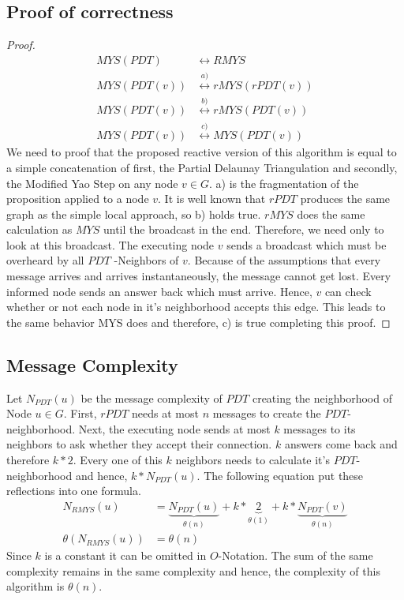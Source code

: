 \subsection{Proof of correctness}
\begin{proof}
\begin{equation*}
\begin{split}
	MYS(PDT) &\leftrightarrow RMYS\\
	MYS(PDT(v)) &\stackrel{a)}{\leftrightarrow} rMYS(rPDT(v)) \\
    MYS(PDT(v)) &\stackrel{b)}{\leftrightarrow} rMYS(PDT(v))\\
    MYS(PDT(v)) &\stackrel{c)}{\leftrightarrow} MYS(PDT(v)) 
\end{split}
\end{equation*}
We need to proof that the proposed reactive version of this algorithm is equal to a simple concatenation of first, the Partial Delaunay Triangulation and secondly, the Modified Yao Step on any node $v \in G$.
a) is the fragmentation of the proposition applied to a node $v $.
It is well known that $rPDT $ produces the same graph as the simple local approach, so b) holds true.
$rMYS $ does the same calculation as $MYS $ until the broadcast in the end.
Therefore, we need only to look at this broadcast.
The executing node $v $ sends a broadcast which must be overheard by all $PDT $ -Neighbors of $v $.
Because of the assumptions that every message arrives and arrives instantaneously, the message cannot get lost.
Every informed node sends an answer back which must arrive.
Hence, $v $ can check whether or not each node in it's neighborhood accepts this edge.
This leads to the same behavior MYS does and therefore, c) is true completing this proof.
\end{proof}

\subsection{Message Complexity}
Let $N_{PDT}(u) $ be the message complexity of $PDT $ creating the neighborhood of Node $u \in G$.
First, $rPDT $ needs at most $n $ messages to create the $PDT $-neighborhood.
Next, the executing node sends at most $k $ messages to its neighbors to ask whether they accept their connection.
$k $ answers come back and therefore $k * 2 $.
Every one of this $k $ neighbors needs to calculate it's $PDT $-neighborhood and hence, $k*N_{PDT}(u) $.
The following equation put these reflections into one formula.
\begin{equation*}
\begin{split}
N_{RMYS}(u) &= \underbrace{N_{PDT}(u)}_{\theta (n)} +k *\underbrace{2}_{\theta (1)} + k*\underbrace{N_{PDT}(v)}_{\theta (n)} \\
\theta (N_{RMYS}(u)) &= \theta (n) 
\end{split}
\end{equation*}
Since $k $ is a constant it can be omitted in $O $-Notation.
The sum of the same complexity remains in the same complexity and hence, the complexity of this algorithm is $\theta (n) $.


